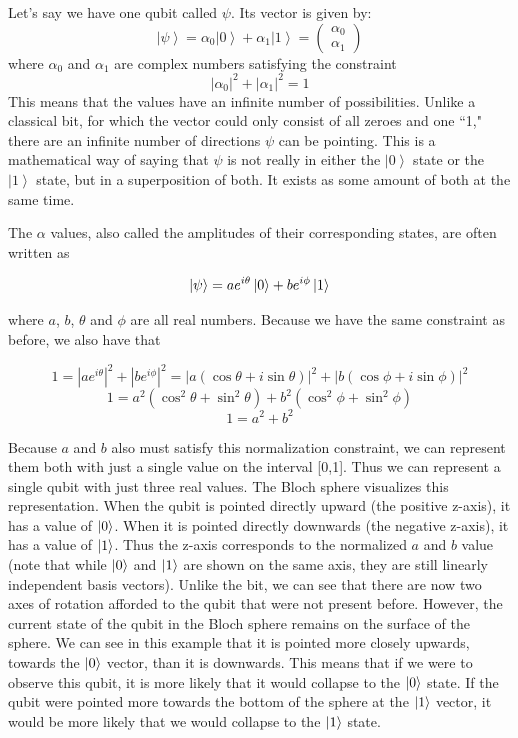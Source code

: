 \documentclass[11pt]{report}
\newcommand{\?}{\stackrel{?}{=}}
\begin{document}
Let’s say we have one qubit called $\psi$. Its vector is given by:
$$ \left | \psi \right \rangle=\alpha _{0}\left | 0 \right \rangle+\alpha _{1}\left | 1 \right \rangle=\begin{pmatrix}\alpha_{0}\\ \alpha_{1}\end{pmatrix}$$
where $\alpha _{0}$ and $\alpha_{1}$ are complex numbers satisfying the constraint 
$$ \left | \alpha_{0} \right |^{2} + \left | \alpha_{1} \right |^{2}=1$$
This means that the  values have an infinite number of possibilities. Unlike a classical bit, for which the vector could only consist of all zeroes and one ``1," there are an infinite number of directions $\psi$ can be pointing. This is a mathematical way of saying that $\psi$ is not really in either the $\left | 0 \right \rangle$ state or the $\left | 1 \right \rangle$ state, but in a superposition of both. It exists as some amount of both at the same time.

The $\alpha$ values, also called the amplitudes of their corresponding states, are often written as

$$\ket{\psi} = ae^{i\theta}\ket{0} + be^{i\phi}\ket{1}$$

where $a$, $b$, $\theta$ and $\phi$ are all real numbers. Because we have the same constraint as before, we also have that

$$1 = |ae^{i\theta}|^2 + |be^{i\phi}|^2 = |a(\cos{\theta}+i\sin{\theta})|^2 + |b(\cos{\phi}+i\sin{\phi})|^2$$
$$1 = a^2(\cos^2{\theta} + \sin^2{\theta}) + b^2(\cos^2{\phi} + \sin^2{\phi})$$
$$1 = a^2 + b^2$$ 

Because $a$ and $b$ also must satisfy this normalization constraint, we can represent them both with just a single value on the interval [0,1]. Thus we can represent a single qubit with just three real values. The Bloch sphere visualizes this representation. When the qubit is pointed directly upward (the positive z-axis), it has a value of $\ket{0}$. When it is pointed directly downwards (the negative z-axis), it has a value of $\ket{1}$. Thus the z-axis corresponds to the normalized $a$ and $b$ value (note that while $\ket{0}$ and $\ket{1}$ are shown on the same axis, they are still linearly independent basis vectors).  Unlike the bit, we can see that there are now two axes of rotation afforded to the qubit that were not present before. However, the current state of the qubit in the Bloch sphere remains on the surface of the sphere. We can see in this example that it is pointed more closely upwards, towards the $\ket{0}$ vector, than it is downwards. This means that if we were to observe this qubit, it is more likely that it would collapse to the $\ket{0}$ state. If the qubit were pointed more towards the bottom of the sphere at the $\ket{1}$ vector, it would be more likely that we would collapse to the $\ket{1}$ state.
\end{document}
